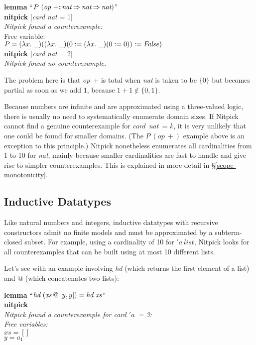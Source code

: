 \documentclass[a4paper,12pt]{article}
\def\Colon{\mathord{:\mkern-1.5mu:}}
\def\unk{{\_}}
\def\unkef{(\lambda x.\; \unk)}
\renewcommand\_{\hbox{\textunderscore\kern-.05ex}}
\begin{document}
\prew
\textbf{lemma} ``$P~(\textit{op}~{+}\Colon
\textit{nat}\mathbin{\Rightarrow}\textit{nat}\mathbin{\Rightarrow}\textit{nat})$'' \\
\textbf{nitpick} [\textit{card nat} = 1] \\[2\smallskipamount]
{\slshape Nitpick found a counterexample:} \\[2\smallskipamount]
\hbox{}\qquad Free variable: \nopagebreak \\
\hbox{}\qquad\qquad $P = \unkef(\unkef(0 := \unkef(0 := 0)) := \mathit{False})$ \\[2\smallskipamount]
\textbf{nitpick} [\textit{card nat} = 2] \\[2\smallskipamount]
{\slshape Nitpick found no counterexample.}
\postw

The problem here is that \textit{op}~+ is total when \textit{nat} is taken to be
$\{0\}$ but becomes partial as soon as we add $1$, because
$1 + 1 \notin \{0, 1\}$.

Because numbers are infinite and are approximated using a three-valued logic,
there is usually no need to systematically enumerate domain sizes. If Nitpick
cannot find a genuine counterexample for \textit{card~nat}~= $k$, it is very
unlikely that one could be found for smaller domains. (The $P~(\textit{op}~{+})$
example above is an exception to this principle.) Nitpick nonetheless enumerates
all cardinalities from 1 to 10 for \textit{nat}, mainly because smaller
cardinalities are fast to handle and give rise to simpler counterexamples. This
is explained in more detail in \S\ref{scope-monotonicity}.

\subsection{Inductive Datatypes}
\label{inductive-datatypes}

Like natural numbers and integers, inductive datatypes with recursive
constructors admit no finite models and must be approximated by a subterm-closed
subset. For example, using a cardinality of 10 for ${'}a~\textit{list}$,
Nitpick looks for all counterexamples that can be built using at most 10
different lists.

Let's see with an example involving \textit{hd} (which returns the first element
of a list) and $@$ (which concatenates two lists):

\prew
\textbf{lemma} ``$\textit{hd}~(\textit{xs} \mathbin{@} [y, y]) = \textit{hd}~\textit{xs\/}$'' \\
\textbf{nitpick} \\[2\smallskipamount]
\slshape Nitpick found a counterexample for \textit{card} $'a$~= 3: \\[2\smallskipamount]
\hbox{}\qquad Free variables: \nopagebreak \\
\hbox{}\qquad\qquad $\textit{xs} = []$ \\
\hbox{}\qquad\qquad $\textit{y} = a_1$
\postw
\end{document}
